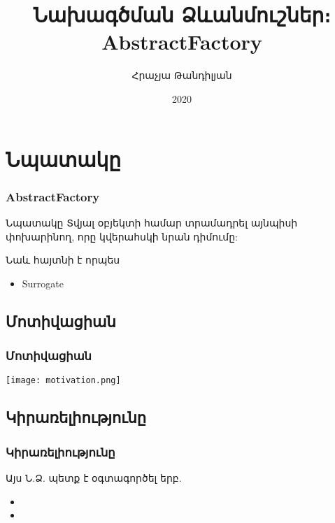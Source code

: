 \documentclass{beamer}
\begin{document}
\title[AbstractFactory]{Նախագծման Ձևանմուշներ։ AbstractFactory}
\author[Հրաչյա Թանդիլյան\copyright]{Հրաչյա Թանդիլյան}
\date{2020}

\begin{frame}
\titlepage
\end{frame}

\section{Նպատակը}
\begin{frame}\frametitle{AbstractFactory}
\begin{block}{Նպատակը}
    Տվյալ օբյեկտի համար տրամադրել այնպիսի փոխարինող, որը կվերահսկի նրան դիմումը:
\end{block}
\vfill
Նաև հայտնի է որպես
\begin{itemize}
    \item Surrogate
\end{itemize}
\end{frame}

\subsection{Մոտիվացիան}
\begin{frame}\frametitle{Մոտիվացիան}
\begin{center}
    \texttt{[image: motivation.png]}
\end{center}
\end{frame}

\subsection{Կիրառելիությունը}
\begin{frame}\frametitle{Կիրառելիությունը}
Այս Ն.Ձ. պետք է օգտագործել երբ.
\vspace{0.5cm}
\begin{itemize}
    \item
    \item
\end{itemize}
\end{frame}
\end{document}
